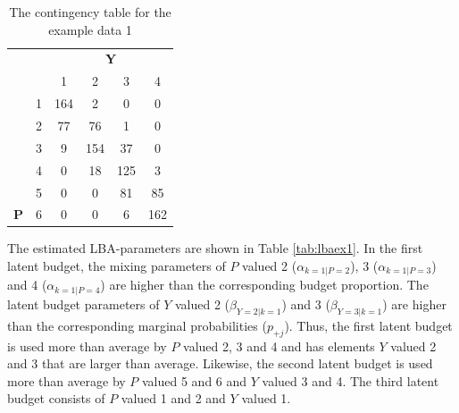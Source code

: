 \documentclass[]{interact}
\theoremstyle{plain}%
\theoremstyle{definition}
\theoremstyle{remark}
\begin{document}
\begin{table}[H]

\caption{\label{tab:tabex1}The contingency table for the example data 1}
\centering
\begin{tabular}[t]{>{}cccccc}
\toprule
\multicolumn{1}{c}{\textbf{ }} & \multicolumn{1}{c}{\textbf{ }} & \multicolumn{4}{c}{\textbf{Y}} \\
\cmidrule(l{3pt}r{3pt}){3-6}
 &  & 1 & 2 & 3 & 4\\
\midrule
 & 1 & 164 & 2 & 0 & 0\\

 & 2 & 77 & 76 & 1 & 0\\

 & 3 & 9 & 154 & 37 & 0\\

 & 4 & 0 & 18 & 125 & 3\\

 & 5 & 0 & 0 & 81 & 85\\

\multirow{-6}{*}{\centering\arraybackslash \textbf{P}} & 6 & 0 & 0 & 6 & 162\\
\bottomrule
\end{tabular}
\end{table}

The estimated LBA-parameters are shown in Table \ref{tab:lbaex1}. In the
first latent budget, the mixing parameters of \(P\) valued 2
(\(\alpha_{k=1|P=2}\)), 3 (\(\alpha_{k=1|P=3}\)) and 4
(\(\alpha_{k=1|P=4}\)) are higher than the corresponding budget
proportion. The latent budget parameters of \(Y\) valued 2
(\(\beta_{Y=2|k=1}\)) and 3 (\(\beta_{Y=3|k=1}\)) are higher than the
corresponding marginal probabilities (\(p_{+j}\)). Thus, the first
latent budget is used more than average by \(P\) valued 2, 3 and 4 and
has elements \(Y\) valued 2 and 3 that are larger than average.
Likewise, the second latent budget is used more than average by \(P\)
valued 5 and 6 and \(Y\) valued 3 and 4. The third latent budget
consists of \(P\) valued 1 and 2 and \(Y\) valued 1.
\end{document}
